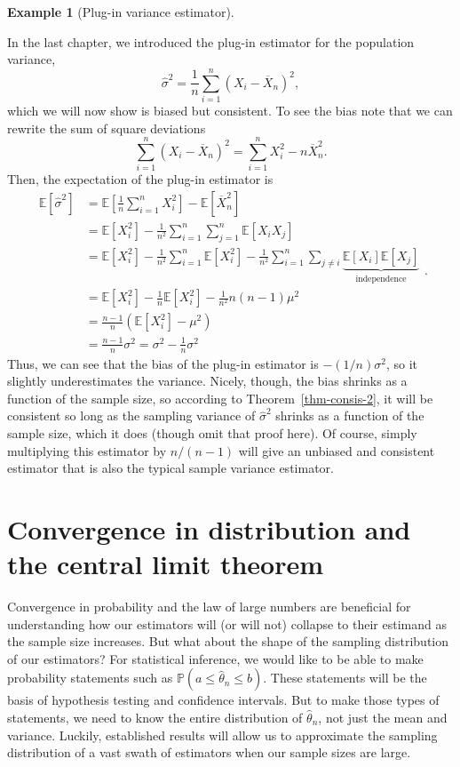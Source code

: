 \documentclass[
  13pt,
  letterpaper,
  DIV=11,
  numbers=noendperiod]{scrreprt}
\newcommand{\E}{\mathbb{E}}
\renewcommand{\P}{\mathbb{P}}
\newcommand{\Xbar}{\overline{X}}
\theoremstyle{definition}
\theoremstyle{definition}
\newtheorem{example}{Example}[chapter]
\theoremstyle{plain}
\theoremstyle{remark}
\begin{document}
\begin{example}[Plug-in variance
estimator]\protect\hypertarget{exm-plug-in-variance}{}\label{exm-plug-in-variance}

In the last chapter, we introduced the plug-in estimator for the
population variance, \[
\widehat{\sigma}^2 = \frac{1}{n} \sum_{i=1}^n (X_i - \Xbar_n)^2,
\] which we will now show is biased but consistent. To see the bias note
that we can rewrite the sum of square deviations
\[\sum_{i=1}^n (X_i - \Xbar_n)^2 = \sum_{i=1}^n X_i^2 - n\Xbar_n^2. \]
Then, the expectation of the plug-in estimator is \[
\begin{aligned}
\E[\widehat{\sigma}^2] & = \E\left[\frac{1}{n}\sum_{i=1}^n X_i^2\right] - \E[\Xbar_n^2] \\
&= \E[X_i^2] - \frac{1}{n^2}\sum_{i=1}^n \sum_{j=1}^n \E[X_iX_j] \\
&= \E[X_i^2] - \frac{1}{n^2}\sum_{i=1}^n \E[X_i^2] - \frac{1}{n^2}\sum_{i=1}^n \sum_{j\neq i} \underbrace{\E[X_i]\E[X_j]}_{\text{independence}} \\
&= \E[X_i^2] - \frac{1}{n}\E[X_i^2] - \frac{1}{n^2} n(n-1)\mu^2 \\
&= \frac{n-1}{n} \left(\E[X_i^2] - \mu^2\right) \\
&= \frac{n-1}{n} \sigma^2 = \sigma^2 - \frac{1}{n}\sigma^2
\end{aligned}. 
\] Thus, we can see that the bias of the plug-in estimator is
\(-(1/n)\sigma^2\), so it slightly underestimates the variance. Nicely,
though, the bias shrinks as a function of the sample size, so according
to Theorem~\ref{thm-consis-2}, it will be consistent so long as the
sampling variance of \(\widehat{\sigma}^2\) shrinks as a function of the
sample size, which it does (though omit that proof here). Of course,
simply multiplying this estimator by \(n/(n-1)\) will give an unbiased
and consistent estimator that is also the typical sample variance
estimator.

\end{example}

\section{Convergence in distribution and the central limit
theorem}\label{convergence-in-distribution-and-the-central-limit-theorem}

Convergence in probability and the law of large numbers are beneficial
for understanding how our estimators will (or will not) collapse to
their estimand as the sample size increases. But what about the shape of
the sampling distribution of our estimators? For statistical inference,
we would like to be able to make probability statements such as
\(\P(a \leq \widehat{\theta}_n \leq b)\). These statements will be the
basis of hypothesis testing and confidence intervals. But to make those
types of statements, we need to know the entire distribution of
\(\widehat{\theta}_n\), not just the mean and variance. Luckily,
established results will allow us to approximate the sampling
distribution of a vast swath of estimators when our sample sizes are
large.
\end{document}
